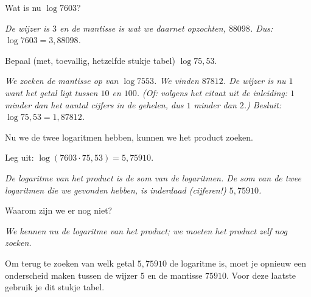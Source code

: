 \begin{werktekstoef}

\setcounter{enumi}{2}

\item Wat is nu $\log 7603$?

\emph{De wijzer is $3$ en de mantisse is wat we daarnet opzochten, $88098$. Dus: $\log 7603=3,88098$.}

\item Bepaal (met, toevallig, hetzelfde stukje tabel) $\log 75,53$.

\emph{We zoeken de mantisse op van $\log 7553$. We vinden $87812$. De wijzer is nu $1$ want het getal ligt tussen $10$ en $100$. (Of: volgens het citaat uit de inleiding: $1$ minder dan het aantal cijfers in de gehelen, dus $1$ minder dan $2$.) Besluit: $\log 75,53=1,87812$.}

\end{werktekstoef}

Nu we de twee logaritmen hebben, kunnen we het product zoeken.

\begin{werktekstoef}

\setcounter{enumi}{4}

\item Leg uit: $\log \left(7603\cdot 75,53\right)=5,75910$.

\emph{De logaritme van het product is de som van de logaritmen. De som van de twee logaritmen die we gevonden hebben, is inderdaad (cijferen!) $5,75910$.}

\item Waarom zijn we er nog niet?

\emph{We kennen nu de logaritme van het product; we moeten het product zelf nog zoeken.}

\end{werktekstoef}

Om terug te zoeken van welk getal $5,75910$ de logaritme is, moet je opnieuw een onderscheid maken tussen de wijzer $5$ en de mantisse $75910$. Voor deze laatste gebruik je dit stukje tabel.



